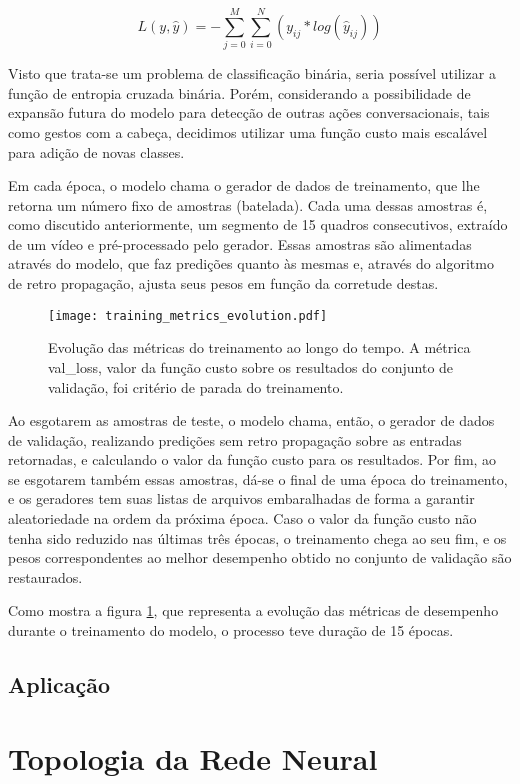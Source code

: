 \begin{equation} \label{eq:categorical_crossentropy}
    L(y,\hat{y})=-\sum\limits_{j=0}^M\sum\limits_{i=0}^N(y_{ij}*log(\hat{y}_{ij}))
\end{equation}

Visto que trata-se um problema de classificação binária, seria possível utilizar a função de entropia cruzada binária. 
Porém, considerando a possibilidade de expansão futura do modelo para detecção de outras ações conversacionais, tais como gestos com a cabeça, decidimos utilizar uma função custo mais escalável para adição de novas classes.

Em cada época, o modelo chama o gerador de dados de treinamento, que lhe retorna um número fixo de amostras (batelada).
Cada uma dessas amostras é, como discutido anteriormente, um segmento de 15 quadros consecutivos, extraído de um vídeo e pré-processado pelo gerador.
Essas amostras são alimentadas através do modelo, que faz predições quanto às mesmas e, através do algoritmo de retro propagação, ajusta seus pesos em função da corretude destas.

\begin{figure}[ht]
    \centering
    \texttt{[image: training\_metrics\_evolution.pdf]}
    \caption{Evolução das métricas do treinamento ao longo do tempo. A métrica val\_loss, valor da função custo sobre os resultados do conjunto de validação, foi critério de parada do treinamento.}
    \label{fig:train_metrics_evo}
\end{figure}

Ao esgotarem as amostras de teste, o modelo chama, então, o gerador de dados de validação, realizando predições sem retro propagação sobre as entradas retornadas, e calculando o valor da função custo para os resultados.
Por fim, ao se esgotarem também essas amostras, dá-se o final de uma época do treinamento, e os geradores tem suas listas de arquivos embaralhadas de forma a garantir aleatoriedade na ordem da próxima época.
Caso o valor da função custo não tenha sido reduzido nas últimas três épocas, o treinamento chega ao seu fim, e os pesos correspondentes ao melhor desempenho obtido no conjunto de validação são restaurados.

Como mostra a figura \ref{fig:train_metrics_evo}, que representa a evolução das métricas de desempenho durante o treinamento do modelo, o processo teve duração de 15 épocas.

\subsection{Aplicação}
\label{subsec:application}

% 


\section{Topologia da Rede Neural}
\label{sec:topology}

